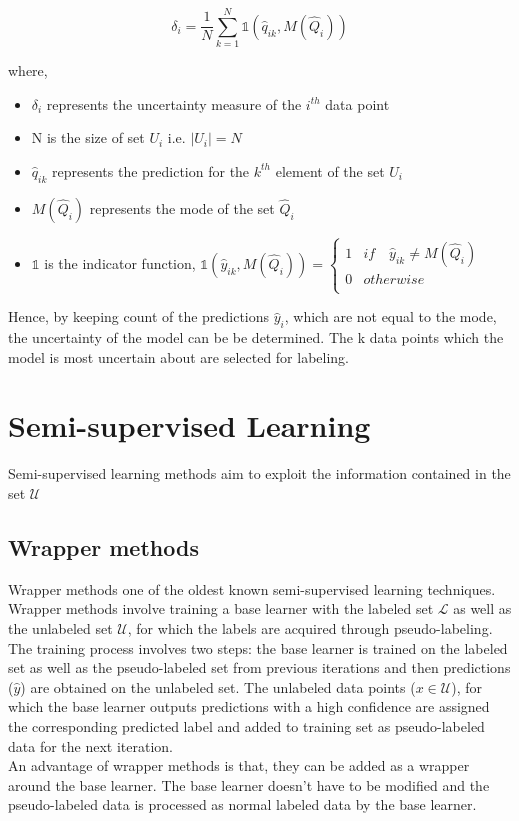 \begin{equation}
    \label{equation:augmentation_based_sampling}
    \delta_{i} = \frac{1}{N} \sum_{k=1}^{N} \mathbb{1}(\hat{q}_{ik}, M(\hat{Q}_i))
\end{equation}

where,
\begin{itemize}[label={}]
  \setlength\itemsep{0em}
  \item $\delta_{i}$ represents the uncertainty measure of the $i^{th}$ data point
  \item N is the size of set $U_i$ i.e. $|U_i| = N$
  \item $\hat{q}_{ik}$ represents the prediction for the $k^{th}$ element of the set $U_i$
  \item $M(\hat{Q}_i)$ represents the mode of the set $\hat{Q}_i$
  \item $\mathbb{1}$ is the indicator function, $\mathbb{1}(\hat{y}_{ik}, M(\hat{Q}_i)) = \begin{cases} 
      1 & if \quad \hat{y}_{ik} \neq M(\hat{Q}_i) \\
      0 & otherwise \\
   \end{cases}$
\end{itemize}

Hence, by keeping count of the predictions $\hat{y}_i$, which are not equal to the mode, the uncertainty of the model can be be determined. The k data points which the model is most uncertain about are selected for labeling.

\section{Semi-supervised Learning}\label{section:semi_supervised}
Semi-supervised learning methods aim to exploit the information contained in the set $\mathcal{U}$
\subsection{Wrapper methods}
Wrapper methods one of the oldest known semi-supervised learning techniques\cite{van2020}. Wrapper methods involve training a base learner with the labeled set $\mathcal{L}$ as well as the unlabeled set $\mathcal{U}$, for which the labels are acquired through pseudo-labeling\cite{mclachlan1975}. The training process involves two steps: the base learner is trained on the labeled set as well as the pseudo-labeled set from previous iterations and then predictions ($\hat{y}$) are obtained on the unlabeled set. The unlabeled data points ($x \in \mathcal{U}$), for which the base learner outputs predictions with a high confidence are assigned the corresponding predicted label and added to training set as pseudo-labeled data for the next iteration. \\
An advantage of wrapper methods is that, they can be added as a wrapper around the base learner. The base learner doesn't have to be modified and the pseudo-labeled data is processed as normal labeled data by the base learner.

